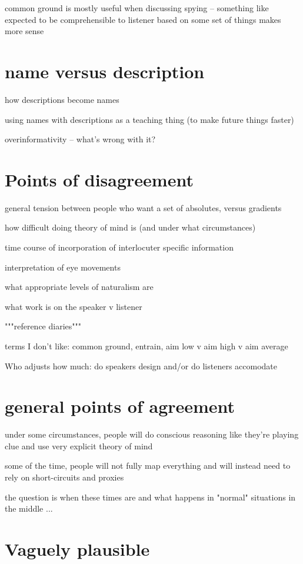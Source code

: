 \documentclass[]{article}
\begin{document}
common ground is mostly useful when discussing spying -- something like expected to be comprehensible to listener based on some set of things makes more sense 

\section{name versus description}

how descriptions become names

using names with descriptions as a teaching thing (to make future things faster) 

overinformativity -- what's wrong with it? 

\section{Points of disagreement}

general tension between people who want a set of absolutes, versus gradients

how difficult doing theory of mind is (and under what circumstances)

time course of incorporation of interlocuter specific information 

interpretation of eye movements

what appropriate levels of naturalism are

what work is on the speaker v listener

"""reference diaries"""

terms I don't like: common ground, entrain, aim low v aim high v aim average

Who adjusts how much: do speakers design and/or do listeners accomodate


\section{general points of agreement}

under some circumstances, people will do conscious reasoning like they're playing clue and use very explicit theory of mind 

some of the time, people will not fully map everything and will instead need to rely on short-circuits and proxies 

the question is when these times are and what happens in "normal" situations in the middle ... 


\section{Vaguely plausible}
\end{document}
